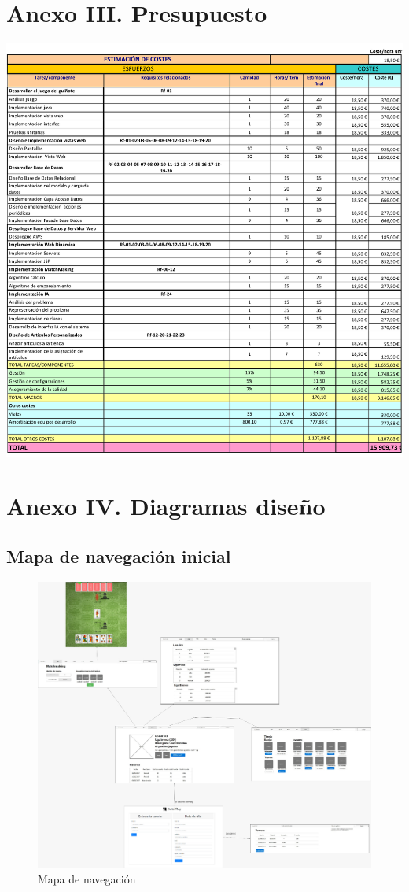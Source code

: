 \documentclass[]{article}
\begin{document}
\section*{Anexo III. Presupuesto}
\label{an3}
\hspace{-1.3cm}
\includegraphics[scale=0.9]{figuras/presup.pdf}
\clearpage
\section*{Anexo IV. Diagramas diseño}
\label{an4}
\subsection*{Mapa de navegación inicial}
\begin{figure}[H]
  \includegraphics[width=\linewidth]{figuras/mapaInicial}
  \caption{Mapa de navegación}
  \label{fig:mapaDeNavegacion}
\end{figure}
\clearpage
\end{document}
